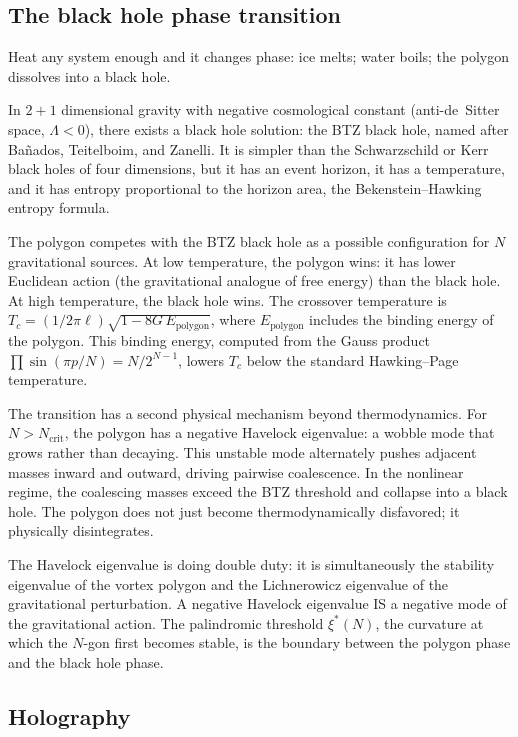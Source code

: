 \medskip

\subsection*{The black hole phase transition}

Heat any system enough and it changes phase: ice melts; water boils;
the polygon dissolves into a black hole.

In $2{+}1$ dimensional gravity with negative cosmological constant
(anti-de~Sitter space, $\Lambda < 0$), there exists a black hole
solution: the BTZ black hole, named after Ba\~nados, Teitelboim, and
Zanelli. It is simpler than the Schwarzschild or Kerr black holes of
four dimensions, but it has an event horizon, it has a temperature, and
it has entropy proportional to the horizon area, the Bekenstein--Hawking
entropy formula.

The polygon competes with the BTZ black hole as a possible configuration
for $N$ gravitational sources. At low temperature, the polygon wins: it
has lower Euclidean action (the gravitational analogue of free energy)
than the black hole. At high temperature, the black hole wins. The
crossover temperature is
$T_c = (1/2\pi\ell)\sqrt{1 - 8G\,E_{\text{polygon}}}$,
where $E_{\text{polygon}}$ includes the binding energy of the polygon.
This binding energy, computed from the Gauss product
$\prod\sin(\pi p/N) = N/2^{N-1}$, lowers $T_c$ below the standard
Hawking--Page temperature.

The transition has a second physical mechanism beyond thermodynamics.
For $N > N_{\text{crit}}$, the polygon has a negative Havelock
eigenvalue: a wobble mode that grows rather than decaying. This unstable
mode alternately pushes adjacent masses inward and outward, driving
pairwise coalescence. In the nonlinear regime, the coalescing masses
exceed the BTZ threshold and collapse into a black hole. The polygon
does not just become thermodynamically disfavored; it physically
disintegrates.

The Havelock eigenvalue is doing double duty: it is simultaneously the
stability eigenvalue of the vortex polygon and the Lichnerowicz eigenvalue
of the gravitational perturbation. A negative Havelock eigenvalue IS a
negative mode of the gravitational action. The palindromic threshold
$\xi^*(N)$, the curvature at which the $N$-gon first becomes stable, is
the boundary between the polygon phase and the black hole phase.

\subsection*{Holography}

